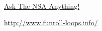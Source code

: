\documentclass{article}
\begin{document}
\href{https://google.com}{Ask The NSA Anything!}

\url{http://www.funroll-loops.info/}
\end{document}
